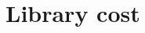 \documentclass{article}
\newcommand{\pending}[1]{\textcolor{red}{[\,#1\,]}}
\begin{document}
%

\section{Library cost}
\label{sec:metric}
\end{document}
